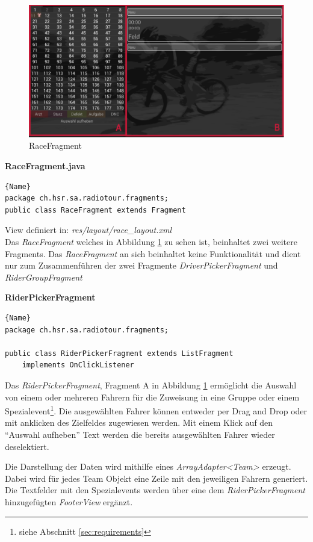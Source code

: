 \begin{figure}[h!]
\caption{RaceFragment}
\label{fig:racefragment}
\centering
\includegraphics[scale=0.8]{07anhang/images/dev_racefragment.png}
\end{figure}


\textbf{RaceFragment.java}
\begin{lstlisting}{Name}
package ch.hsr.sa.radiotour.fragments;
public class RaceFragment extends Fragment 
\end{lstlisting}


View definiert in:
\textit{res/layout/race\_layout.xml}
\\

Das \textit{RaceFragment} welches in Abbildung \ref{fig:racefragment} zu sehen ist, beinhaltet zwei weitere Fragments. Das \textit{RaceFragment} an sich beinhaltet keine Funktionalität und dient nur zum Zusammenführen der zwei Fragmente \textit{DriverPickerFragment} und \textit{RiderGroupFragment}

\textbf{RiderPickerFragment}
\begin{lstlisting}{Name}
package ch.hsr.sa.radiotour.fragments;

public class RiderPickerFragment extends ListFragment
	implements OnClickListener
\end{lstlisting}

Das \textit{RiderPickerFragment}, Fragment A in Abbildung \ref{fig:racefragment} ermöglicht die Auswahl von einem oder mehreren Fahrern für die Zuweisung in eine Gruppe oder einem Spezialevent\footnote{siehe Abschnitt \ref{sec:requirements}}. Die ausgewählten Fahrer können entweder per Drag and Drop oder mit anklicken des Zielfeldes zugewiesen werden. Mit einem Klick auf den "`Auswahl aufheben"' Text werden die bereits ausgewählten Fahrer wieder deselektiert.

Die Darstellung der Daten wird mithilfe eines \textit{ArrayAdapter<Team>} erzeugt. Dabei wird für jedes Team Objekt eine Zeile mit den jeweiligen Fahrern generiert. Die Textfelder mit den Spezialevents werden über eine dem \textit{RiderPickerFragment} hinzugefügten \textit{FooterView} ergänzt.


